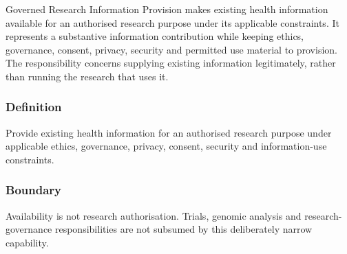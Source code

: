 Governed Research Information Provision makes existing health information available for an authorised research purpose under its applicable constraints. It represents a substantive information contribution while keeping ethics, governance, consent, privacy, security and permitted use material to provision. The responsibility concerns supplying existing information legitimately, rather than running the research that uses it.

\subsubsection*{Definition}

Provide existing health information for an authorised research purpose under applicable ethics, governance, privacy, consent, security and information-use constraints.

\subsubsection*{Boundary}

Availability is not research authorisation. Trials, genomic analysis and research-governance responsibilities are not subsumed by this deliberately narrow capability.

